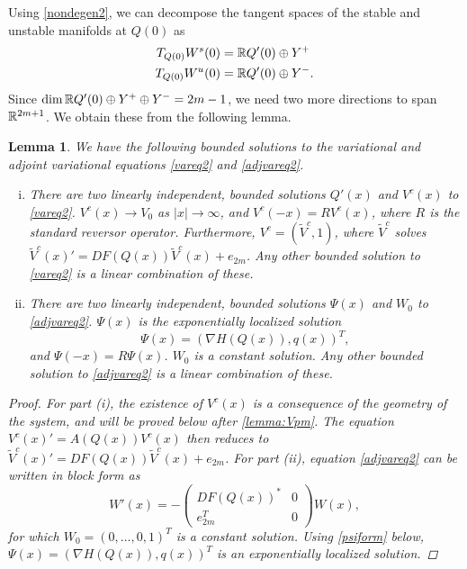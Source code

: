 \documentclass[12pt]{elsarticle}
\theoremstyle{plain}
\newtheorem{lemma}[theorem]{Lemma}
\theoremstyle{definition}
\theoremstyle{remark}
\numberwithin{theorem}{section}
\numberwithin{equation}{section}
\begin{document}
\noi Using \cref{nondegen2}, we can decompose the tangent spaces of the stable and unstable manifolds at $Q(0)$ as
\begin{equation}\label{TQ0decomp}
\begin{aligned}
T_{Q(0)}W^s(0) &= \mathbb{R} Q'(0) \oplus Y^+ \\
T_{Q(0)}W^u(0) &= \mathbb{R} Q'(0) \oplus Y^-.
\end{aligned}
\end{equation}
Since $\mathop\mathrm{dim}\nolimits \mathbb{R} Q'(0) \oplus Y^+ \oplus Y^- = 2m-1$, we need two more directions to span $\mathbb{R}^{2m+1}$. We obtain these from the following lemma.

\begin{lemma}\label{varadjsolutions}
We have the following bounded solutions to the variational and adjoint variational equations \cref{vareq2} and \cref{adjvareq2}.
\begin{enumerate}[(i)]
	\item There are two linearly independent, bounded solutions $Q'(x)$ and $V^c(x)$ to \cref{vareq2}. $V^c(x) \rightarrow V_0$ as $|x| \rightarrow \infty$, and	$V^c(-x) = R V^c(x)$, where $R$ is the standard reversor operator. Furthermore, $V^c = (\tilde{V}^c, 1)$, where $\tilde{V}^c$ solves $\tilde{V}^c(x)' = DF(Q(x)) \tilde{V}^c(x) + e_{2m}$. Any other bounded solution to \cref{vareq2} is a linear combination of these.

	\item There are two linearly independent, bounded solutions $\Psi(x)$ and $W_0$ to \cref{adjvareq2}. $\Psi(x)$ is the exponentially localized solution
	\begin{equation}\label{psicomponents}
	\Psi(x) = (\nabla H(Q(x)), q(x))^T, 
	\end{equation}
	and $\Psi(-x) = R \Psi(x)$. $W_0$ is a constant solution. Any other bounded solution to \cref{adjvareq2} is a linear combination of these.
\end{enumerate}
\begin{proof}
For part (i), the existence of $V^c(x)$ is a consequence of the geometry of the system, and will be proved below after \cref{lemma:Vpm}. The equation $V^c(x)' = A(Q(x))V^c(x)$ then reduces to $\tilde{V}^c(x)' = DF(Q(x)) \tilde{V}^c(x) + e_{2m}$. For part (ii), equation \cref{adjvareq2} can be written in block form as
\[
W'(x) = - 
\begin{pmatrix}DF(Q(x))^* & 0 \\ e_{2m}^T & 0 \end{pmatrix} W(x),
\]
for which $W_0 = (0, \dots, 0, 1)^T$ is a constant solution. Using \cref{psiform} below, $\Psi(x) = ( \nabla H(Q(x)), q(x) )^T$ is an exponentially localized solution. 
\end{proof}
\end{lemma}
\end{document}
